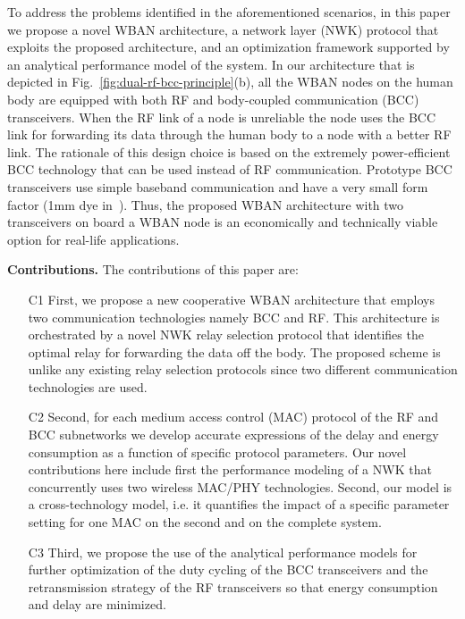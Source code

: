 \documentclass[10pt]{IEEEtran}
\begin{document}
To address the problems identified in the aforementioned scenarios, in this paper we propose a novel WBAN architecture, a network layer (NWK) protocol that exploits the proposed architecture, and an optimization framework supported by an analytical performance model of the system. In our architecture that is depicted in Fig.~\ref{fig:dual-rf-bcc-principle}(b), all the WBAN nodes on the human body are equipped with both RF and body-coupled communication (BCC) transceivers. When the RF link of a node is unreliable the node uses the BCC link for forwarding its data through the human body to a node with a better RF link. The rationale of this design choice is based on the extremely power-efficient BCC technology that can be used instead of RF communication. Prototype BCC transceivers use simple baseband communication and have a very small form factor (1mm dye in~\cite{fazzi09}). Thus, the proposed WBAN architecture with two transceivers on board a WBAN node is an economically and technically viable option for real-life applications.

\textbf{Contributions.} The contributions of this paper are:
\begin{itemize}
\item[C1] First, we propose a new cooperative WBAN architecture that employs two communication technologies namely BCC and RF. This architecture is orchestrated by a novel NWK relay selection protocol that identifies the optimal relay for forwarding the data off the body. The proposed scheme is unlike any existing relay selection protocols since two different communication technologies are used.
\item[C2] Second, for each medium access control (MAC) protocol of the RF and BCC subnetworks we develop accurate expressions of the delay and energy consumption as a function of specific protocol parameters.
Our novel contributions here include first the performance modeling of a NWK that concurrently uses two wireless MAC/PHY technologies. Second, our model is a cross-technology model, i.e. it quantifies the impact of a specific parameter setting for one MAC on the second and on the complete system.
\item[C3] Third, we propose the use of the analytical performance models for further optimization of the duty cycling of the BCC transceivers and the retransmission strategy of the RF transceivers so that energy consumption and delay are minimized.
\end{itemize}
\end{document}
